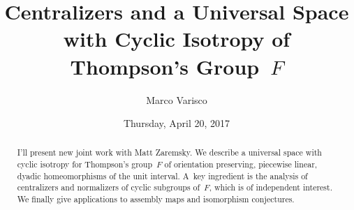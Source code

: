 \documentclass{UAmathtalk}
\author{Marco Varisco}
\title{Centralizers and a Universal Space with Cyclic Isotropy of Thompson's Group~\texorpdfstring{$F$}{F}}
\date{Thursday, April 20, 2017}
\begin{document}
\maketitle

\begin{abstract}
I'll present new joint work with Matt Zaremsky.
We describe a universal space with cyclic isotropy for Thompson's group~$F$ of orientation preserving, piecewise linear, dyadic homeomorphisms of the unit interval.
A~key ingredient is the analysis of centralizers and normalizers of cyclic subgroups of~$F$, which is of independent interest.
We finally give applications to assembly maps and isomorphism conjectures.
\end{abstract}
\end{document}
